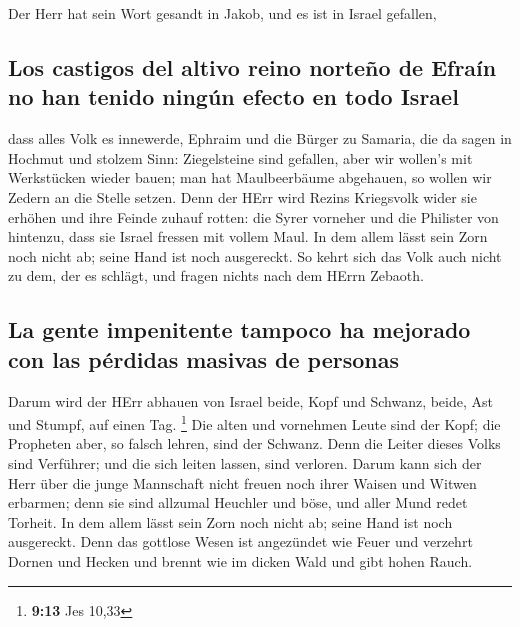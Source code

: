  Der Herr hat sein Wort gesandt in Jakob, und es ist in
Israel gefallen,

\hypertarget{los-castigos-del-altivo-reino-norteuxf1o-de-efrauxedn-no-han-tenido-ninguxfan-efecto-en-todo-israel}{%
\subsection{Los castigos del altivo reino norteño de Efraín no han
tenido ningún efecto en todo
Israel}\label{los-castigos-del-altivo-reino-norteuxf1o-de-efrauxedn-no-han-tenido-ninguxfan-efecto-en-todo-israel}}

 dass alles Volk es innewerde, Ephraim und die Bürger zu
Samaria, die da sagen in Hochmut und stolzem Sinn: 
Ziegelsteine sind gefallen, aber wir wollen's mit Werkstücken wieder
bauen; man hat Maulbeerbäume abgehauen, so wollen wir Zedern an die
Stelle setzen.  Denn der HErr wird Rezins Kriegsvolk
wider sie erhöhen und ihre Feinde zuhauf rotten:  die
Syrer vorneher und die Philister von hintenzu, dass sie Israel fressen
mit vollem Maul. In dem allem lässt sein Zorn noch nicht ab; seine Hand
ist noch ausgereckt.  So kehrt sich das Volk auch nicht
zu dem, der es schlägt, und fragen nichts nach dem HErrn Zebaoth.

\hypertarget{la-gente-impenitente-tampoco-ha-mejorado-con-las-puxe9rdidas-masivas-de-personas}{%
\subsection{La gente impenitente tampoco ha mejorado con las pérdidas
masivas de
personas}\label{la-gente-impenitente-tampoco-ha-mejorado-con-las-puxe9rdidas-masivas-de-personas}}

 Darum wird der HErr abhauen von Israel beide, Kopf und
Schwanz, beide, Ast und Stumpf, auf einen Tag. \footnote{\textbf{9:13}
  Jes 10,33}  Die alten und vornehmen Leute sind der
Kopf; die Propheten aber, so falsch lehren, sind der Schwanz.
 Denn die Leiter dieses Volks sind Verführer; und die
sich leiten lassen, sind verloren.  Darum kann sich der
Herr über die junge Mannschaft nicht freuen noch ihrer Waisen und Witwen
erbarmen; denn sie sind allzumal Heuchler und böse, und aller Mund redet
Torheit. In dem allem lässt sein Zorn noch nicht ab; seine Hand ist noch
ausgereckt.  Denn das gottlose Wesen ist angezündet wie
Feuer und verzehrt Dornen und Hecken und brennt wie im dicken Wald und
gibt hohen Rauch.

